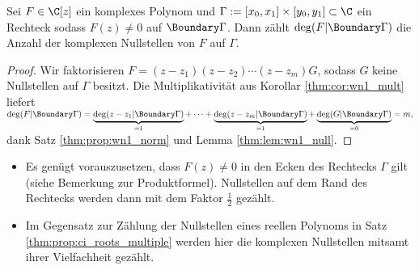 \documentclass{mythesis}
\begin{document}
\begin{corollary} \label{thm:cor:complex-roots}
    Sei $F \in \C[z]$ ein komplexes Polynom und $\Gamma := [x_0,x_1] \times [y_0, y_1] \subset \C$ ein Rechteck sodass $F(z) \neq 0$ auf $\Boundary\Gamma$.
    Dann zählt $\deg(F|\Boundary\Gamma)$ die Anzahl der komplexen Nullstellen von $F$ auf $\Gamma$.
    \begin{proof}
        Wir faktorisieren $F = (z-z_1)(z-z_2) \dotsb(z-z_m) G$, sodass $G$ keine Nullstellen auf $\Gamma$ besitzt.
        Die Multiplikativität aus Korollar \ref{thm:cor:wn1_mult} liefert
        \begin{math}
            \deg(F|\Boundary\Gamma) = \underbrace{\deg(z-z_1|\Boundary\Gamma)}_{=1} + \dotsb + \underbrace{\deg(z-z_m|\Boundary\Gamma)}_{=1} + \underbrace{\deg(G|\Boundary\Gamma)}_{=0}
            = m,
        \end{math}
        dank Satz \ref{thm:prop:wn1_norm} und Lemma \ref{thm:lem:wn1_null}.
    \end{proof}
    \begin{note}
        \begin{itemize}
            \item
                Es genügt vorauszusetzen, dass $F(z) \neq 0$ in den Ecken des Rechtecks $\Gamma$ gilt (siehe Bemerkung zur Produktformel).
                Nullstellen auf dem Rand des Rechtecks werden dann mit dem Faktor $\frac{1}{2}$ gezählt.
            \item
                Im Gegensatz zur Zählung der Nullstellen eines reellen Polynoms in Satz \ref{thm:prop:ci_roots_multiple} werden hier die komplexen Nullstellen mitsamt ihrer Vielfachheit gezählt.
        \end{itemize}
    \end{note}
\end{corollary}
\end{document}
